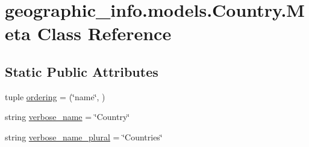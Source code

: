 \hypertarget{classgeographic__info_1_1models_1_1_country_1_1_meta}{\section{geographic\-\_\-info.\-models.\-Country.\-Meta Class Reference}
\label{classgeographic__info_1_1models_1_1_country_1_1_meta}
}
\subsection*{Static Public Attributes}
\begin{DoxyCompactItemize}
\item 
tuple \hyperlink{classgeographic__info_1_1models_1_1_country_1_1_meta_a109585f8ca52106bc0221abab3d03c77}{ordering} = (\char`\"{}name\char`\"{}, )
\item 
string \hyperlink{classgeographic__info_1_1models_1_1_country_1_1_meta_a99b3792f3111ad9419f50007aa634222}{verbose\-\_\-name} = \char`\"{}Country\char`\"{}
\item 
string \hyperlink{classgeographic__info_1_1models_1_1_country_1_1_meta_a4455061c02459575254167375c62958b}{verbose\-\_\-name\-\_\-plural} = \char`\"{}Countries\char`\"{}
\end{DoxyCompactItemize}


